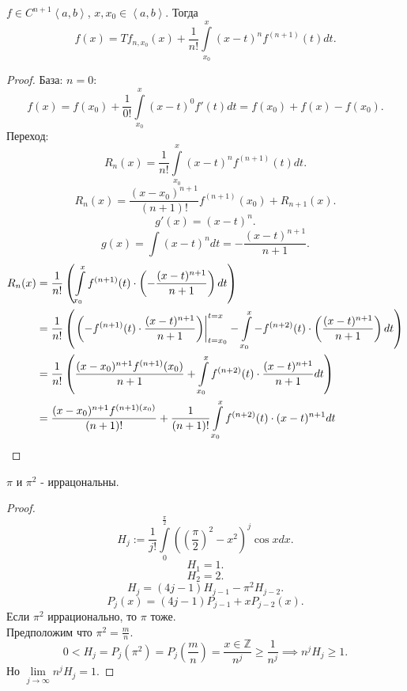 \documentclass[11pt, oneside]{article}   	%
\begin{document}
\begin{definition}
    $f\in C^{n+1}\left<a, b\right>$, $x, x_0\in \left<a, b\right>$. Тогда
    \[ f(x) = Tf_{n,x_0}(x) + \frac{1}{n!} \int\limits_{x_0}^{x} (x-t)^{n}f^{(n+1)}(t) dt  .\]
    \begin{proof}
        База: $n=0$:
        \[ f(x) = f(x_0) + \frac{1}{0!} \int\limits_{x_0}^{x} (x-t)^{0} f'(t) dt = f(x_0) + f(x) - f(x_0)  .\]
        Переход:
        \[ R_n(x) = \frac{1}{n!} \int\limits_{x_0}^{x} (x-t)^{n}f^{(n+1)}(t)dt  .\]
        \[ R_{n}(x) = \frac{(x-x_0)^{n+1}}{(n+1)!} f^{(n+1)}(x_0) + R_{n+1}(x) .\]
        \[ g'(x) = (x-t)^{n} .\]
        \[ g(x) = \int (x-t)^{n} dt = -\frac{(x-t)^{n+1}}{n+1} .\]
        \begin{equation*}
            \begin{split}
                R_n(x) &= \frac{1}{n!}\left( \int\limits_{x_0}^{x} f^{(n+1)}(t) \cdot \left( - \frac{(x-t)^{n+1}}{n+1} \right)dt   \right)\\
                       &= \frac{1}{n!}\left( \left.\left(-f^{(n+1)}(t) \cdot \frac{(x-t)^{n+1}}{n+1}\right)\right|_{t=x_0}^{t=x} - \int\limits_{x_0}^{x} -f^{(n+2)}(t) \cdot  \left( \frac{(x-t)^{n+1}}{n+1} \right)dt    \right)\\
                       &= \frac{1}{n!}\left( \frac{(x-x_0)^{n+1}f^{(n+1)}(x_0)}{n+1} + \int\limits_{x_0}^{x} f^{(n+2)}(t) \cdot \frac{(x-t)^{n+1}}{n+1} dt \right)\\
                       &= \frac{(x-x_0)^{n+1}f^{(n+1)(x_0)}}{(n+1)!} + \frac{1}{(n+1)!} \int\limits_{x_0}^{x} f^{(n+2)}(t) \cdot (x-t)^{n+1} dt \qedhere 
            \end{split}
        \end{equation*}
    \end{proof}
\end{definition}
\begin{theorem}
    $\pi$ и $\pi^2$ - иррацональны.\\
    \begin{proof}
        \[ H_j := \frac{1}{j!} \int\limits_{0}^{\frac{\pi}{2}} \left( \left( \frac{\pi}{2} \right)^2 - x^2  \right)^{j}\cos x dx    .\]
        \[ H_1 = 1 .\]
        \[ H_2 = 2 .\] 
        \[ H_j = (4j-1)H_{j-1} - \pi^2 H_{j-2} .\]
        \[ P_j(x) = (4j-1)P_{j-1} + xP_{j-2}(x).\] 
        Если $\pi^2$ иррационально, то $\pi$ тоже.\\
        Предположим что $\pi^2 = \frac{m}{n}$.\\
        \[ 0 < H_j = P_j(\pi^2) = P_j\left( \frac{m}{n} \right) = \frac{x\in \mathbb{Z}}{n^{j}} \ge \frac{1}{n^{j}} \implies n^{j}H_j \ge 1 .\]
        Но $\lim\limits_{j \to \infty} n^{j}H_j = 1$.
    \end{proof}
\end{theorem}
\end{document}
